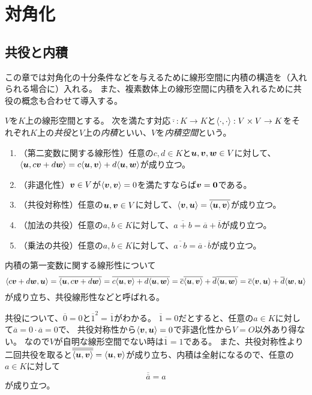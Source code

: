 
\chapter{対角化}

\section{共役と内積}

この章では対角化の十分条件などを与えるために線形空間に内積の構造を（入れられる場合に）入れる。
また、複素数体上の線形空間に内積を入れるために共役の概念も合わせて導入する。

\begin{definition}[内積]
$V$を$K$上の線形空間とする。
次を満たす対応$\overline{\cdot}: K \to K$と$\langle\cdot, \cdot\rangle: V\times V \to K$をそれぞれ$K$上の\emph{共役}と$V$上の\emph{内積}といい、$V$を\emph{内積空間}という。
\begin{enumerate}
\item
（第二変数に関する線形性）任意の$c, d \in K$と$\vb*{u}, \vb*{v}, \vb*{w} \in V$に対して、$\langle\vb*{u}, c\vb*{v}+d\vb*{w}\rangle = c\langle\vb*{u}, \vb*{v}\rangle+d\langle\vb*{u}, \vb*{w}\rangle$が成り立つ。
\item
（非退化性）$\vb*{v} \in V$が$\langle\vb*{v}, \vb*{v}\rangle = 0$を満たすならば$\vb*{v} = \vb*{0}$である。
\item
（共役対称性）任意の$\vb*{u}, \vb*{v} \in V$に対して、$\langle\vb*{v}, \vb*{u}\rangle = \overline{\langle\vb*{u}, \vb*{v}\rangle}$が成り立つ。
\item
（加法の共役）任意の$a, b \in K$に対して、$\overline{a+b} = \overline{a}+\overline{b}$が成り立つ。
\item
（乗法の共役）任意の$a, b \in K$に対して、$\overline{a\cdot b} = \overline{a}\cdot\overline{b}$が成り立つ。
\end{enumerate}
\end{definition}

\begin{remark}
内積の第一変数に関する線形性について
$$
\langle c\vb*{v}+d\vb*{w}, \vb*{u}\rangle
= \overline{\langle\vb*{u}, c\vb*{v}+d\vb*{w}\rangle}
= \overline{c\langle\vb*{u}, \vb*{v}\rangle+d\langle\vb*{u}, \vb*{w}\rangle}
= \overline{c}\overline{\langle\vb*{u}, \vb*{v}\rangle}+\overline{d}\overline{\langle\vb*{u}, \vb*{w}\rangle}
= \overline{c}\langle\vb*{v}, \vb*{u}\rangle+\overline{d}\langle\vb*{w}, \vb*{u}\rangle
$$
が成り立ち、共役線形性などと呼ばれる。
\end{remark}

\begin{remark}
共役について、$\overline{0} = 0$と$\overline{1}^2 = \overline{1}$がわかる。
$\overline{1} = 0$だとすると、任意の$a \in K$に対して$\overline{a} = 0\cdot\overline{a} = 0$で、
共役対称性から$\langle\vb*{v}, \vb*{u}\rangle = 0$で非退化性から$V = O$以外あり得ない。
なので$V$が自明な線形空間でない時は$\overline{1} = 1$である。
また、共役対称性より二回共役を取ると$\overline{\overline{\langle\vb*{u}, \vb*{v}\rangle}} = \langle\vb*{u}, \vb*{v}\rangle$が成り立ち、内積は全射になるので、任意の$a \in K$に対して
$$
\overline{\overline{a}} = a
$$
が成り立つ。
\end{remark}

